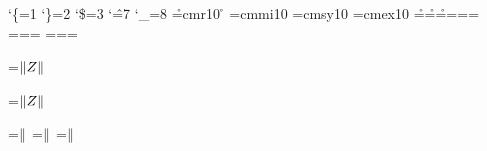 %
%
%
%
%
%
%
\catcode`\{=1 \catcode`\}=2 \catcode`\$=3 \catcode`\^=7 \catcode`\_=8
\font\r=cmr10 \r \hsize=300pt \parindent=0pt
\font\mi=cmmi10 \font\sy=cmsy10 \font\ex=cmex10
=\r {}=\r {}=\r
{}=\mi {}=\mi {}=\mi
{}=\sy {}=\sy {}=\sy
{}=\ex {}=\ex {}=\ex
{}  

=\hbox{$\mathopen\delimiter"026B30D Z\mathclose\delimiter"026B30E$}

=\hbox{$\delimiter"026B30D Z\delimiter"026B30E$}

=\hbox{$\mathord\delimiter"026B30D$}
=\hbox{$\mathbin\delimiter"026B30D$}
=\hbox{$\mathrel\delimiter"026B30D$}

